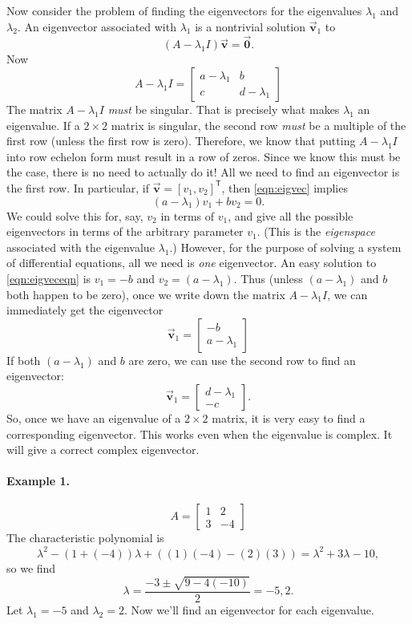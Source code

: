 \documentclass[reqno]{immbook}
\newcommand{\BV}{\vec{\textbf{v}}}
\newcommand{\BZ}{\vec{\textbf{0}}}  %
\begin{document}
Now consider the problem of finding the eigenvectors
for the eigenvalues $\lambda_1$ and $\lambda_2$.
An eigenvector associated with $\lambda_1$ is a nontrivial
solution $\BV_1$ to
\begin{equation}
    (A-\lambda_1 I)\BV = \BZ.
\label{eqn:eigvec}
\end{equation}
Now
\[
   A - \lambda_1 I = \begin{bmatrix}
                           a-\lambda_1 & b \\
			   c & d-\lambda_1
                     \end{bmatrix}
\]
The matrix $A-\lambda_1 I$ \emph{must} be singular.
That is precisely what makes $\lambda_1$ an eigenvalue.
If a $2\times 2$ matrix is singular, the second
row \emph{must} be a multiple of the first row (unless
the first row is zero).  Therefore, we know that putting
$A-\lambda_1 I$ into row echelon form must result in
a row of zeros.  Since we know this must be the case,
there is no need to actually do it!  All we need to
find an eigenvector is the first row.
In particular, if $\BV = [v_1,v_2]^{\textsf{T}}$,
then \eqref{eqn:eigvec} implies
\begin{equation}
  (a-\lambda_1)v_1 + b v_2 = 0.
\label{eqn:eigveceqn}
\end{equation}
We could solve this for, say, $v_2$ in terms of $v_1$,
and give all the possible eigenvectors in terms of
the arbitrary parameter $v_1$. (This is the
\emph{eigenspace} associated with the eigenvalue $\lambda_1$.)
However, for the
purpose of solving a system of differential equations,
all we need is \emph{one} eigenvector.
An easy solution to \eqref{eqn:eigveceqn}
is $v_1=-b$ and $v_2 = (a-\lambda_1)$.
Thus (unless $(a-\lambda_1)$ and $b$ both happen to be
zero), once we write down the matrix $A-\lambda_1 I$,
we can immediately get the eigenvector
\[
   \BV_1 = \begin{bmatrix} -b \\ a-\lambda_1 \end{bmatrix}
\]
If both $(a-\lambda_1)$ and $b$ are zero, we can use the
second row to find an eigenvector:
\[
   \BV_1 = \begin{bmatrix} d-\lambda_1 \\ -c \end{bmatrix}.
\]
So, once we have an eigenvalue
of a $2\times 2$ matrix, it is very easy to find
a corresponding eigenvector.
This works even when the eigenvalue is complex.
It will give a correct complex eigenvector.

\paragraph{Example 1.}
\[
   A = \begin{bmatrix} 1 & 2 \\ 3 & -4 \end{bmatrix}
\]
The characteristic polynomial is
\[
   \lambda^2 - (1+(-4))\lambda + ((1)(-4)-(2)(3)) = \lambda^2 + 3\lambda - 10,
\]
so we find
\[
  \lambda = \frac{-3\pm\sqrt{9-4(-10)}}{2} = -5, 2.
\]
Let $\lambda_1 = -5$ and $\lambda_2 = 2$.
Now we'll find an eigenvector for each eigenvalue.
\end{document}
